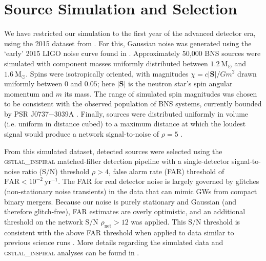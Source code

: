 \section{Source Simulation and Selection}

We have restricted our simulation to the first year of the advanced detector era, using the 2015 dataset from \citet{Singer_2014}.  For this, Gaussian noise was generated using the `early' 2015 LIGO noise curve found in \citet{Barsotti:2012}.  Approximately 50,000 BNS sources were simulated with component masses uniformly distributed between $1.2~\mathrm{M}_\odot$ and $1.6~\mathrm{M}_\odot$.  Spins were isotropically oriented, with magnitudes $\chi = c |\mathbf{S}|/G m^2$ drawn uniformly between $0$ and $0.05$; here $|\mathbf{S}|$ is the neutron star's spin angular momentum and $m$ its mass.  The range of simulated spin magnitudes was chosen to be consistent with the observed population of BNS systems, currently bounded by PSR J0737$-$3039A \citep{Burgay_2003,Brown_2012}.  Finally, sources were distributed uniformly in volume (i.e. uniform in distance cubed) to a maximum distance at which the loudest signal would produce a network signal-to-noise of $\rho = 5$ \citep{Singer_2014}.

From this simulated dataset, detected sources were selected using the \textsc{gstlal\_inspiral} matched-filter detection pipeline \citep{Cannon_2012} with a single-detector signal-to-noise ratio (S/N) threshold $\rho>4$, false alarm rate (FAR) threshold of $\mathrm{FAR}<10^{-2}~\mathrm{yr}^{-1}$.  The FAR for real detector noise is largely governed by glitches (non-stationary noise transients) in the data that can mimic GWs from compact binary mergers.  Because our noise is purely stationary and Gaussian (and therefore glitch-free), FAR estimates are overly optimistic, and an additional threshold on the network S/N $\rho_\mathrm{net} > 12$ was applied.  This S/N threshold is consistent with the above FAR threshold when applied to data similar to previous science runs \cite{2013arXiv1304.0670L,Berry_2014}.  More details regarding the simulated data and \textsc{gstlal\_inspiral} analyses can be found in \citet{Singer_2014}.